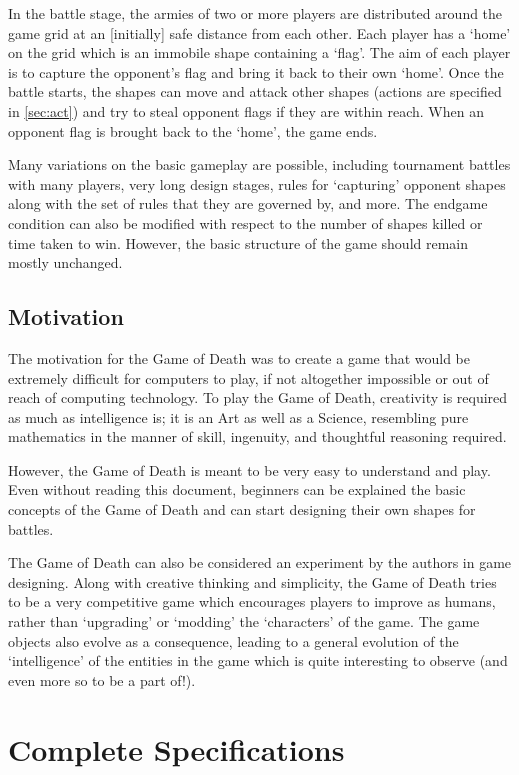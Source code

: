 \documentclass[a4paper,11pt]{article}
\begin{document}
In the battle stage, the armies of two or more players are distributed around the game grid at an [initially] safe distance from each other. Each player has a `home' on the grid which is an immobile shape containing a `flag'. The aim of each player is to capture the opponent's flag and bring it back to their own `home'. Once the battle starts, the shapes can move and attack other shapes (actions are specified in \hyperref[sec:act]{\autoref*{sec:act}}) and try to steal opponent flags if they are within reach. When an opponent flag is brought back to the `home', the game ends.

Many variations on the basic gameplay are possible, including tournament battles with many players, very long design stages, rules for `capturing' opponent shapes along with the set of rules that they are governed by, and more. The endgame condition can also be modified with respect to the number of shapes killed or time taken to win. However, the basic structure of the game should remain mostly unchanged. 

\subsection{Motivation}

The motivation for the Game of Death was to create a game that would be extremely difficult for computers to play, if not altogether impossible or out of reach of computing technology. To play the Game of Death, creativity is required as much as intelligence is; it is an Art as well as a Science, resembling pure mathematics in the manner of skill, ingenuity, and thoughtful reasoning required.

However, the Game of Death is meant to be very easy to understand and play. Even without reading this document, beginners can be explained the basic concepts of the Game of Death and can start designing their own shapes for battles.

The Game of Death can also be considered an experiment by the authors in game designing. Along with creative thinking and simplicity, the Game of Death tries to be a very competitive game which encourages players to improve as humans, rather than `upgrading' or `modding' the `characters' of the game. The game objects also evolve as a consequence, leading to a general evolution of the `intelligence' of the entities in the game which is quite interesting to observe (and even more so to be a part of!).

\newpage
\section{Complete Specifications}
\end{document}

